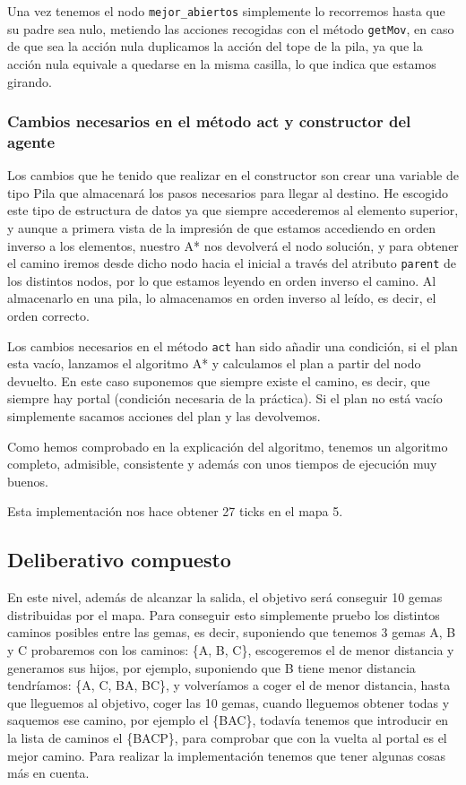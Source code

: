 \documentclass[10pt, spanish]{article}
\begin{document}
Una vez tenemos el nodo \texttt{mejor\_abiertos} simplemente lo recorremos hasta que su padre sea nulo, metiendo las acciones recogidas con el método \texttt{getMov}, en caso de que sea la acción nula duplicamos la acción del tope de la pila, ya que la acción nula equivale a quedarse en la misma casilla, lo que indica que estamos girando.

\subsubsection{Cambios necesarios en el método act y constructor del agente}

Los cambios que he tenido que realizar en el constructor son crear una variable de tipo Pila que almacenará los pasos necesarios para llegar al destino. He escogido este tipo de estructura de datos ya que siempre accederemos al elemento superior, y aunque a primera vista de la impresión de que estamos accediendo en orden inverso a los elementos, nuestro A* nos devolverá el nodo solución, y para obtener el camino iremos desde dicho nodo hacia el inicial a través del atributo \texttt{parent} de los distintos nodos, por lo que estamos leyendo en orden inverso el camino. Al almacenarlo en una pila, lo almacenamos en orden inverso al leído, es decir, el orden correcto.

Los cambios necesarios en el método \texttt{act} han sido añadir una condición, si el plan esta vacío, lanzamos el algoritmo A* y calculamos el plan a partir del nodo devuelto. En este caso suponemos que siempre existe el camino, es decir, que siempre hay portal (condición necesaria de la práctica). Si el plan no está vacío simplemente sacamos acciones del plan y las devolvemos.

Como hemos comprobado en la explicación del algoritmo, tenemos un algoritmo completo, admisible, consistente y además con unos tiempos de ejecución muy buenos.

Esta implementación nos hace obtener 27 ticks en el mapa 5.

\newpage

\subsection{Deliberativo compuesto}

En este nivel, además de alcanzar la salida, el objetivo será conseguir 10 gemas distribuidas por el mapa. Para conseguir esto simplemente pruebo los distintos caminos posibles entre las gemas, es decir, suponiendo que tenemos 3 gemas A, B y C probaremos con los caminos: \{A, B, C\}, escogeremos el de menor distancia y generamos sus hijos, por ejemplo, suponiendo que B tiene menor distancia tendríamos: \{A, C, BA, BC\}, y volveríamos a coger el de menor distancia, hasta que lleguemos al objetivo, coger las 10 gemas, cuando lleguemos obtener todas y saquemos ese camino, por ejemplo el \{BAC\}, todavía tenemos que introducir en la lista de caminos el \{BACP\}, para comprobar que con la vuelta al portal es el mejor camino. Para realizar la implementación tenemos que tener algunas cosas más en cuenta.
\end{document}
